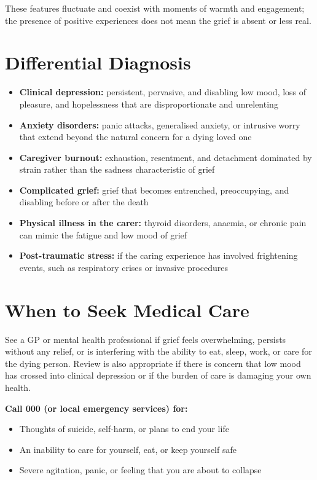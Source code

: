 These features fluctuate and coexist with moments of warmth and engagement; the presence of positive experiences does not mean the grief is absent or less real.

\section*{Differential Diagnosis}
\begin{itemize}
    \item \textbf{Clinical depression:} persistent, pervasive, and disabling low mood, loss of pleasure, and hopelessness that are disproportionate and unrelenting
    \item \textbf{Anxiety disorders:} panic attacks, generalised anxiety, or intrusive worry that extend beyond the natural concern for a dying loved one
    \item \textbf{Caregiver burnout:} exhaustion, resentment, and detachment dominated by strain rather than the sadness characteristic of grief
    \item \textbf{Complicated grief:} grief that becomes entrenched, preoccupying, and disabling before or after the death
    \item \textbf{Physical illness in the carer:} thyroid disorders, anaemia, or chronic pain can mimic the fatigue and low mood of grief
    \item \textbf{Post-traumatic stress:} if the caring experience has involved frightening events, such as respiratory crises or invasive procedures
\end{itemize}

\section*{When to Seek Medical Care}
See a GP or mental health professional if grief feels overwhelming, persists without any relief, or is interfering with the ability to eat, sleep, work, or care for the dying person. Review is also appropriate if there is concern that low mood has crossed into clinical depression or if the burden of care is damaging your own health.

\textbf{Call 000 (or local emergency services) for:}
\begin{itemize}
    \item Thoughts of suicide, self-harm, or plans to end your life
    \item An inability to care for yourself, eat, or keep yourself safe
    \item Severe agitation, panic, or feeling that you are about to collapse
\end{itemize}

